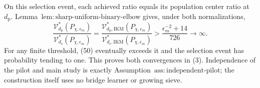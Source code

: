 On this selection event, each achieved ratio equals its population center ratio at \(d_{\mathrm p}\).  Lemma~\(\mathrm{lem{:}sharp\text{-}uniform\text{-}binary\text{-}elbow}\) gives, under both normalizations,
\[
 \frac{\mathcal V_{d_{\mathrm p}}^*(P_{\chi,\epsilon_m})}
 {\mathcal V_{d_{\mathrm e}}^*(P_{\chi,\epsilon_m})}
 =\frac{\mathcal V_{d_{\mathrm p},\mathrm{IKM}}^*(P_{\chi,\epsilon_m})}
 {\mathcal V_{d_{\mathrm e},\mathrm{IKM}}^*(P_{\chi,\epsilon_m})}
 >\frac{\epsilon_m^{-2}+14}{726}\longrightarrow\infty.  \tag{50}
\]
For any finite threshold, (50) eventually exceeds it and the selection event has probability tending to one.  This proves both convergences in (3).  Independence of the pilot and main study is exactly Assumption~\(\mathrm{ass{:}independent\text{-}pilot}\); the construction itself uses no bridge learner or growing sieve.